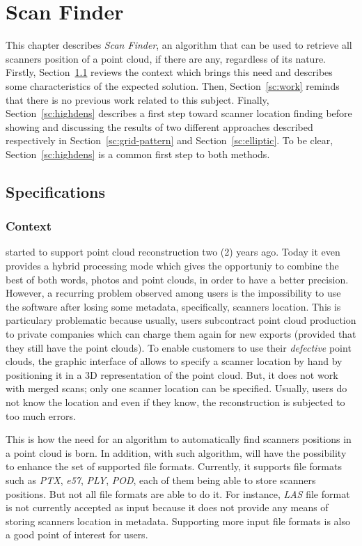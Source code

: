 \chapter{Scan Finder}
\label{ch:scanfinder}
This chapter describes \emph{Scan Finder}, an algorithm that can be used to retrieve all scanners position of a point cloud,  if there are any, regardless of its nature. Firstly, Section~\ref{sc:spec} reviews the context which brings this need and describes some characteristics of the expected solution. Then, Section~\ref{sc:work} reminds that there is no previous work related to this subject. Finally, Section~\ref{sc:highdens} describes a first step toward scanner location
finding before showing and discussing the results of two different approaches described respectively in Section~\ref{sc:grid-pattern} and Section~\ref{sc:elliptic}. To be clear, Section~\ref{sc:highdens} is a common first step to both methods.



\section{Specifications}
\label{sc:spec}
\subsection{Context}
\CC started to support point cloud reconstruction two (2) years ago. Today it even provides a hybrid processing mode which gives the opportuniy to combine the best of both words, photos and point clouds, in order to have a better precision. However, a recurring problem observed among \CC users is the impossibility to use the software after losing some metadata, specifically, scanners location. This is particulary problematic because usually, \CC users subcontract point cloud production to private companies which can charge them again for new exports (provided that they still have the point clouds). To enable customers to use their \emph{defective} point clouds, the graphic interface of \CC allows to specify a scanner location by hand by positioning it in a 3D representation of the point cloud. But, it does not work with merged scans; only one scanner location can be specified. Usually, users do not know the location and even if they know, the reconstruction is subjected to too much errors.

This is how the need for an algorithm to automatically find scanners positions in a point cloud is born. In addition, with such algorithm, \CC will have the possibility to enhance the set of supported file formats. Currently, it supports file formats such as \emph{PTX}, \emph{e57}, \emph{PLY}, \emph{POD}, each of them being able to store scanners positions. But not all file formats are able to do it. For instance, \emph{LAS} file format is not currently accepted as input because it does not provide any means of storing scanners location in metadata. Supporting more input file formats is also a good point of interest for \CC users.


